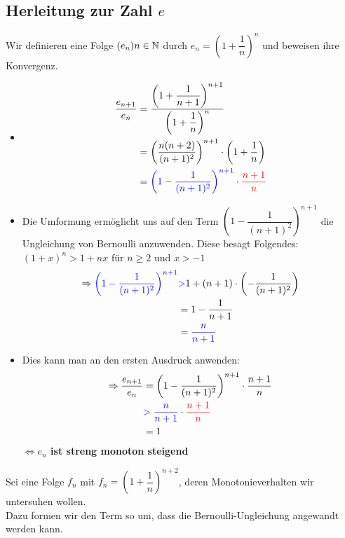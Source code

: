 	\subsection{Herleitung zur Zahl $e$}

Wir definieren eine Folge $(e_{n})n\in\mathbb{N}$ durch $e_{n}=\left(1+\dfrac{1}{n}\right)^n$ und beweisen ihre Konvergenz.

\begin{itemize}
\item\begin{align*}\dfrac{e_{n+1}}{e_{n}}&=\dfrac{{\left(1+\dfrac{1}{n+1}\right)}^{n+1}}{{\left(1+\dfrac{1}{n}\right)}^{n}}\\
&=\left(\dfrac{n(n+2)}{(n+1)^2}\right)^{n+1}\cdot\left(1+\dfrac{1}{n}\right)\\
&=\textcolor{blue}{\left(1-\dfrac{1}{(n+1)^2}\right)^{n+1}}\cdot\textcolor{red}{\dfrac{n+1}{n}}
\end{align*}
\item Die Umformung ermöglicht uns auf den Term $\left(1-\dfrac{1}{(n+1)^2}\right)^{n+1}$ die Ungleichung von Bernoulli anzuwenden. Diese besagt Folgendes: $(1+x)^n>1+nx$ für $n\geq2$ und $x>-1$\\
\begin{align*}\Rightarrow\textcolor{blue}{\left(1-\dfrac{1}{(n+1)^2}\right)^{n+1}}&\textcolor{blue}{  >} 1+(n+1)\cdot\left(-\dfrac{1}{(n+1)^2}\right)\\
&=1-\dfrac{1}{n+1}\\
&=\textcolor{blue}{\dfrac{n}{n+1}}
\end{align*}
\item Dies kann man an den ersten Ausdruck anwenden:\\
\begin{align*}
\Rightarrow\dfrac{e_{n+1}}{e_{n}}&=\left(1-\dfrac{1}{(n+1)^2}\right)^{n+1}\cdot\dfrac{n+1}{n}\\
&\textcolor{blue} {>\dfrac{n}{n+1}}\cdot\textcolor{red}{\dfrac{n+1}{n}}\\
&=1
\end{align*}
\textbf{$\Leftrightarrow e_{n}$ ist streng monoton steigend}
\end{itemize}
Sei eine Folge $f_{n}$ mit $f_{n}=\left(1+\dfrac{1}{n}\right)^{n+2}$, deren Monotonieverhalten wir untersuhen wollen.\\
Dazu formen wir den Term so um, dass die Bernoulli-Ungleichung angewandt werden kann.
